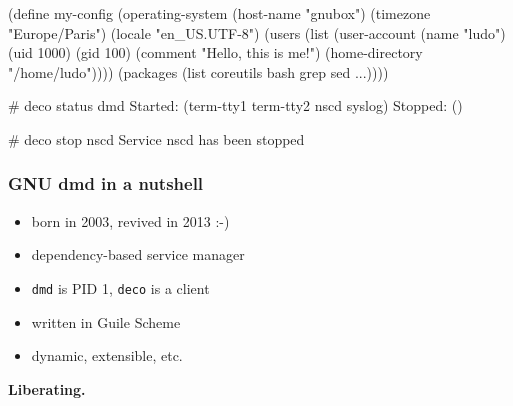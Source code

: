 \documentclass{beamer}
\begin{document}
\begin{frame}
  \begin{semiverbatim}
(define my-config
  (\alert{operating-system}
   (host-name "gnubox")
   (timezone "Europe/Paris")
   (locale "en\_US.UTF-8")
   (users (list (user-account
                 (name "ludo")
                 (uid 1000) (gid 100)
                 (comment "Hello, this is me!")
                 (home-directory "/home/ludo"))))
   (packages (list coreutils bash grep sed
                   \textrm{...}))))
  \end{semiverbatim}
\end{frame}

\begin{frame}
  \begin{semiverbatim}
# deco status dmd
Started: (term-tty1 term-tty2 nscd syslog)
Stopped: ()

# deco stop nscd
Service nscd has been stopped
  \end{semiverbatim}

\end{frame}

\begin{frame}
  \frametitle{GNU dmd in a nutshell}

  \large{
  \begin{itemize}
    \item born in \alert{2003}, revived in 2013 :-)
    \item dependency-based service manager
    \item<2-> \texttt{dmd} is PID 1, \texttt{deco} is a client
    \item<3-> written in \alert{Guile} Scheme
    \item<3-> dynamic, extensible, etc.
  \end{itemize}}
\end{frame}

\begin{frame}[plain]
  \begin{centering}
    \Huge{\textbf{Liberating.}}
  \end{centering}
\end{frame}
\end{document}
